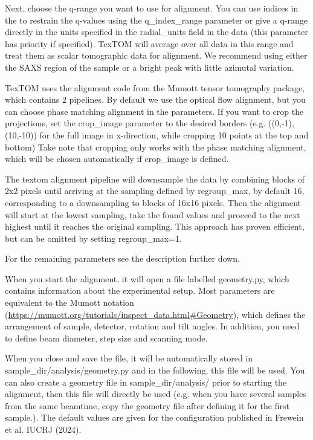 Next, choose the q-range you want to use for alignment. You can use indices in the to restrain the q-values
using the q\_index\_range parameter or give a q-range directly in the units specified in the radial\_units
field in the data (this parameter has priority if specified). TexTOM will average over all data in this range 
and treat them as scalar tomographic data for alignment. We recommend using either the SAXS region of 
the sample or a bright peak with little azimutal variation.

TexTOM uses the alignment code from the Mumott tensor tomography package, which contains 2 pipelines.
By default we use the optical flow alignment, but you can choose phase matching alignment in the parameters.
If you want to crop the projections, set the crop\_image parameter to the desired borders (e.g. ((0,-1),(10,-10))
for the full image in x-direction, while cropping 10 points at the top and bottom)
Take note that cropping only works with the phase matching alignment, which will be chosen automatically if 
crop\_image is defined.

The textom alignment pipeline will downsample the data by combining blocks of 2x2 pixels until arriving at the 
sampling defined by regroup\_max, by default 16, corresponding to a downsampling to blocks of 16x16 pixels.
Then the alignment will start at the lowest sampling, take the found values and proceed to the next highest until it reaches the
original sampling. This approach has proven efficient, but can be omitted by setting regroup\_max=1.

For the remaining parameters see the description further down.

When you start the alignment, it will open a file labelled geometry.py, which contains information about the
experimental setup. Most parameters are equivalent to the Mumott notation (\url{https://mumott.org/tutorials/inspect_data.html#Geometry}),
which defines the arrangement of sample, detector, rotation and tilt angles.
In addition, you need to define beam diameter, step size and scanning mode.

When you close and save the file, it will be automatically stored in sample\_dir/analysis/geometry.py and in the following,
this file will be used. You can also create a geometry file in sample\_dir/analysis/ prior to starting the alignment,
then this file will directly be used (e.g. when you have several samples from the same beamtime, copy the geometry file after
defining it for the first sample.). The default values are given for the configuration published in Frewein et al. IUCRJ (2024).

